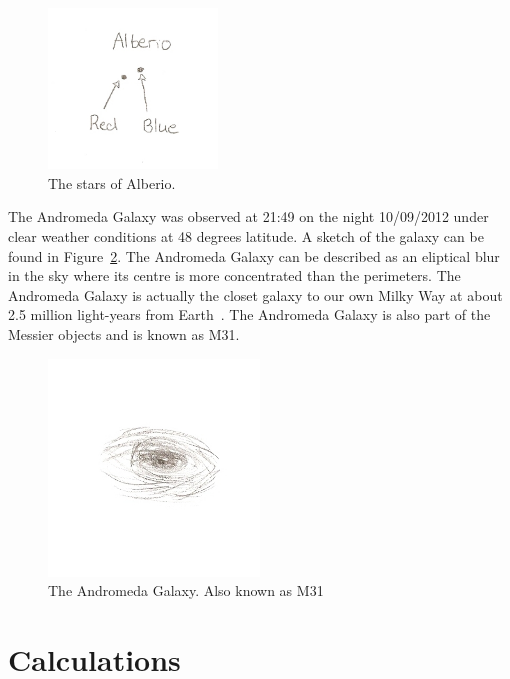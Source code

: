 \documentclass{article}
\begin{document}
\begin{figure}[h!]
\centering
\includegraphics[width=0.4\textwidth]{images/alberio}
\caption{The stars of Alberio.\label{fig:alberio}}
\end{figure}

The Andromeda Galaxy was observed at 21:49 on the night 10/09/2012 under clear weather conditions at 48 degrees latitude. A
sketch of the galaxy can be found in Figure~\ref{fig:andg}. The Andromeda Galaxy can be described as an eliptical blur in the sky
where its centre is more concentrated than the perimeters. The Andromeda Galaxy is actually the closet galaxy to our own 
Milky Way at about 2.5 million light-years from Earth~\cite{Ribas:2005}. The Andromeda Galaxy is also part of the Messier objects and is known as M31.

\begin{figure}[h!]
\centering
\includegraphics[width=0.5\textwidth]{images/andromedagalaxy}
\caption{The Andromeda Galaxy. Also known as M31\label{fig:andg}}
\end{figure}



\section{Calculations}
\end{document}
